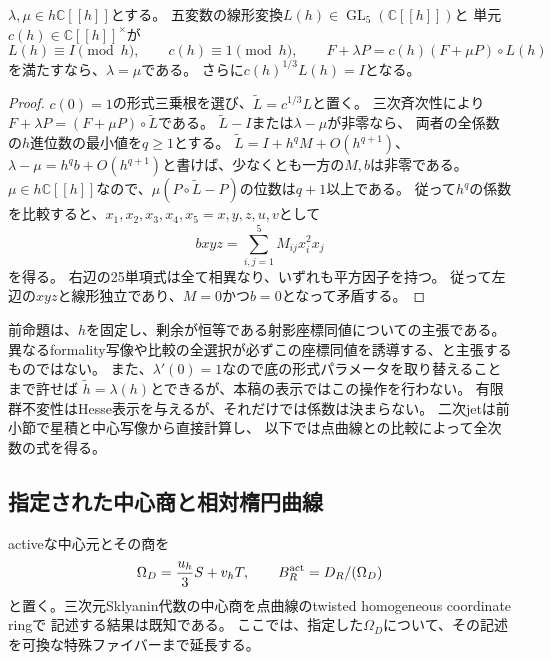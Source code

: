 \begin{proposition}[底を固定したHesse表示の一意性]
\label{gre:prop:marked-hesse-uniqueness}
$\lambda,\mu\in h\mathbb C[[h]]$とする。
五変数の線形変換$L(h)\in\operatorname{GL}_5(\mathbb C[[h]])$と
単元$c(h)\in\mathbb C[[h]]^\times$が
\[
 L(h)\equiv I\pmod h,\qquad c(h)\equiv1\pmod h,\qquad
 F+\lambda P=c(h)(F+\mu P)\circ L(h)
\]
を満たすなら、$\lambda=\mu$である。
さらに$c(h)^{1/3}L(h)=I$となる。
\end{proposition}
\begin{proof}
$c(0)=1$の形式三乗根を選び、$\widetilde L=c^{1/3}L$と置く。
三次斉次性により
$F+\lambda P=(F+\mu P)\circ\widetilde L$である。
$\widetilde L-I$または$\lambda-\mu$が非零なら、
両者の全係数の$h$進位数の最小値を$q\ge1$とする。
$\widetilde L=I+h^qM+O(h^{q+1})$、
$\lambda-\mu=h^qb+O(h^{q+1})$と書けば、少なくとも一方の$M,b$は非零である。
$\mu\in h\mathbb C[[h]]$なので、$\mu(P\circ\widetilde L-P)$の位数は$q+1$以上である。
従って$h^q$の係数を比較すると、$x_1,x_2,x_3,x_4,x_5=x,y,z,u,v$として
\[
 bxyz=\sum_{i,j=1}^{5}M_{ij}x_i^2x_j
\]
を得る。
右辺の25単項式は全て相異なり、いずれも平方因子を持つ。
従って左辺の$xyz$と線形独立であり、$M=0$かつ$b=0$となって矛盾する。
\end{proof}

\begin{remark}[一意性とパラメータの区別]
前命題は、$h$を固定し、剰余が恒等である射影座標同値についての主張である。
異なるformality写像や比較の全選択が必ずこの座標同値を誘導する、と主張するものではない。
また、$\lambda'(0)=1$なので底の形式パラメータを取り替えることまで許せば
$\widetilde h=\lambda(h)$とできるが、本稿の表示ではこの操作を行わない。
有限群不変性はHesse表示を与えるが、それだけでは係数は決まらない。
二次jetは前小節で星積と中心写像から直接計算し、
以下では点曲線との比較によって全次数の式を得る。
\end{remark}

\subsection{指定された中心商と相対楕円曲線}
activeな中心元とその商を
\[
 \Omega_D=\frac{u_h}{3}S+v_hT,\qquad
 B_R^{\rm act}=D_R/(\Omega_D)
\]
と置く。三次元Sklyanin代数の中心商を点曲線のtwisted homogeneous coordinate ringで
記述する結果は既知である\cite[Theorem~6.8]{GRSklyaninATV}\cite[p.~20]{GRSklyaninST}。
ここでは、指定した$\Omega_D$について、その記述を可換な特殊ファイバーまで延長する。

